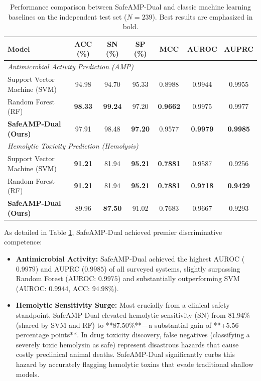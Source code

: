 \documentclass[11pt,a4paper]{article}
\begin{document}
\begin{table}[htbp]
\centering
\caption{Performance comparison between SafeAMP-Dual and classic machine learning baselines on the independent test set ($N = 239$). Best results are emphasized in bold.}
\label{tab:benchmark_comparison}
\small
\begin{tabular*}{\textwidth}{@{\extracolsep{\fill}}lcccccc@{}}
\toprule
\textbf{Model} & \textbf{ACC (\%)} & \textbf{SN (\%)} & \textbf{SP (\%)} & \textbf{MCC} & \textbf{AUROC} & \textbf{AUPRC} \\
\midrule
\multicolumn{7}{l}{\textit{Antimicrobial Activity Prediction (AMP)}} \\
Support Vector Machine (SVM) & 94.98 & 94.70 & 95.33 & 0.8988 & 0.9944 & 0.9955 \\
Random Forest (RF) & \textbf{98.33} & \textbf{99.24} & 97.20 & \textbf{0.9662} & 0.9975 & 0.9977 \\
\textbf{SafeAMP-Dual (Ours)} & 97.91 & 98.48 & \textbf{97.20} & 0.9577 & \textbf{0.9979} & \textbf{0.9985} \\
\midrule
\multicolumn{7}{l}{\textit{Hemolytic Toxicity Prediction (Hemolysis)}} \\
Support Vector Machine (SVM) & \textbf{91.21} & 81.94 & \textbf{95.21} & \textbf{0.7881} & 0.9587 & 0.9256 \\
Random Forest (RF) & \textbf{91.21} & 81.94 & \textbf{95.21} & \textbf{0.7881} & \textbf{0.9718} & \textbf{0.9429} \\
\textbf{SafeAMP-Dual (Ours)} & 89.96 & \textbf{87.50} & 91.02 & 0.7683 & 0.9667 & 0.9293 \\
\bottomrule
\end{tabular*}
\end{table}

As detailed in Table \ref{tab:benchmark_comparison}, SafeAMP-Dual achieved premier discriminative competence:
\begin{itemize}
    \item \textbf{Antimicrobial Activity:} SafeAMP-Dual achieved the highest AUROC ($0.9979$) and AUPRC ($0.9985$) of all surveyed systems, slightly surpassing Random Forest (AUROC: $0.9975$) and substantially outperforming SVM (AUROC: $0.9944$, ACC: $94.98\%$).
    \item \textbf{Hemolytic Sensitivity Surge:} Most crucially from a clinical safety standpoint, SafeAMP-Dual elevated hemolytic sensitivity (SN) from 81.94\% (shared by SVM and RF) to **87.50\%**---a substantial gain of **+5.56 percentage points**. In drug toxicity discovery, false negatives (classifying a severely toxic hemolysin as safe) represent disastrous hazards that cause costly preclinical animal deaths. SafeAMP-Dual significantly curbs this hazard by accurately flagging hemolytic toxins that evade traditional shallow models.
\end{itemize}
\end{document}
